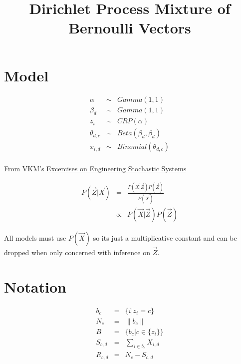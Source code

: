 \documentclass{article}
\begin{document}
\title{Dirichlet Process Mixture of Bernoulli Vectors}
\maketitle

\section{Model}

\begin{equation}
\begin{matrix}
\alpha & \sim & Gamma(1,1) \\
\beta_d & \sim & Gamma(1,1) \\
z_i & \sim & CRP(\alpha) \\
\theta_{d,c} & \sim & Beta(\beta_d,\beta_d) \\
x_{i,d} & \sim & Binomial(\theta_{d,c}) \\
\end{matrix}
\end{equation}

From VKM's \href{https://docs.google.com/document/d/1FolRwjOY2Uc2GghywjhJmX-IcEiRG1S2rEZdGYmIHm8/edit}{Excercises on Engineering Stochastic Systems}

\begin{equation}
\begin{matrix}
P(\vec Z | \vec X) & = & \frac{P(\vec X | \vec Z)P(\vec Z)}{P(\vec X)} \\
 & \propto & P(\vec X | \vec Z)P(\vec Z)
\end{matrix}
\end{equation}

All models must use $P(\vec X)$ so its just a multiplicative constant and can be dropped when only concerned with inference on $\vec Z$.

\section{Notation}
\begin{equation}
\begin{matrix}
b_c & = & \{i | z_i = c\} \\
N_c &  = & \|b_c\| \\
B & = & \{b_c | c \in \{z_i\}\} \\

S_{c,d} & = & \sum_{i \in b_c} X_{i,d} \\
R_{c,d} & = & N_c - S_{c,d} \\
\end{matrix}
\end{equation}
\end{document}
